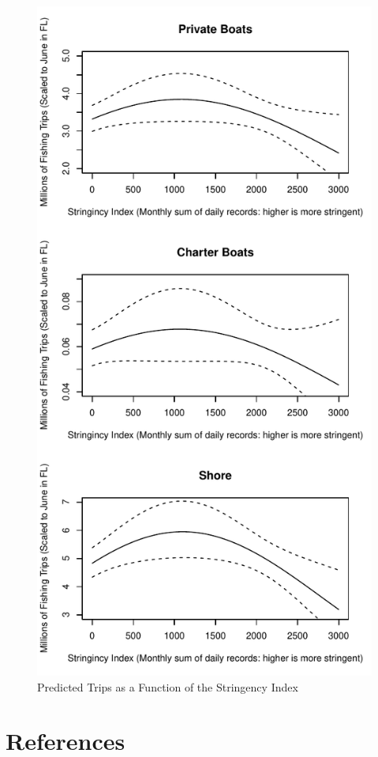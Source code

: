 \documentclass[10pt,letterpaper]{article}
\begin{document}
\begin{figure}
\centering
\includegraphics{C19PolicyRec_files/figure-latex/tripStringRel-1.pdf}
\caption{Predicted Trips as a Function of the Stringency Index}
\end{figure}

\hypertarget{references}{%
\section*{References}\label{references}}

\nolinenumbers
\end{document}
